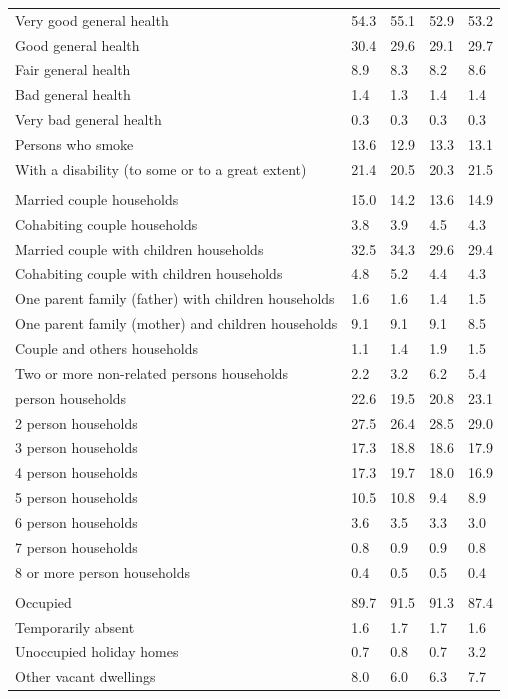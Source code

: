 \documentclass{article}
\begin{document}
\begin{table}[h]
\begin{tabular}{KTTTT}
    \hline
Very good general health & 54.3& 55.1&52.9& 53.2\\
Good general health & 30.4& 29.6& 29.1& 29.7\\
Fair general health & 8.9& 8.3&8.2& 8.6\\
Bad general health & 1.4& 1.3&1.4& 1.4\\
Very bad general health & 0.3& 0.3&0.3& 0.3\\
    \hline
Persons who smoke & 13.6& 12.9&13.3& 13.1\\
    \hline
With a disability (to some or to a great extent) & 21.4& 20.5&20.3& 21.5\\
\hline
    \\ 
    \hline
Married couple households & 15.0& 14.2& 13.6& 14.9\\
Cohabiting couple households & 3.8& 3.9& 4.5& 4.3\\
Married couple with children households & 32.5& 34.3& 29.6& 29.4\\
Cohabiting couple with children households & 4.8& 5.2& 4.4& 4.3\\
One parent family (father) with  children households & 1.6& 1.6& 1.4& 1.5\\
One parent family (mother) and children households & 9.1& 9.1& 9.1& 8.5\\
Couple and others households  & 1.1& 1.4& 1.9& 1.5\\
Two or more non-related persons households & 2.2& 3.2& 6.2& 5.4\\
     person households & 22.6& 19.5& 20.8& 23.1\\
2 person households & 27.5& 26.4& 28.5& 29.0\\
3 person households & 17.3& 18.8& 18.6& 17.9\\
4 person households & 17.3& 19.7& 18.0& 16.9\\
5 person households & 10.5& 10.8&  9.4&  8.9\\
6 person households & 3.6& 3.5& 3.3& 3.0\\
7 person households & 0.8& 0.9& 0.9& 0.8\\
8 or more person households & 0.4& 0.5& 0.5& 0.4\\
\hline
    \\ 
    \hline
Occupied & 89.7& 91.5& 91.3& 87.4\\
Temporarily absent & 1.6& 1.7& 1.7& 1.6\\
Unoccupied holiday homes & 0.7& 0.8& 0.7& 3.2\\
Other vacant dwellings & 8.0& 6.0& 6.3& 7.7\\
\hline
\end{tabular}
\end{table}
\end{document}
